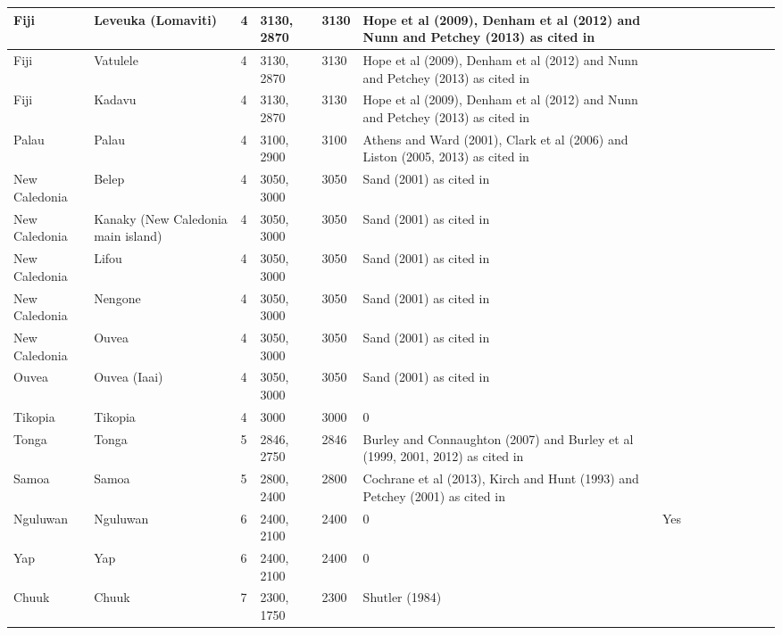 \documentclass[a4paper,10pt]{article} %
\begin{document}
\begin{landscape}
\begin{longtable}{| p{3cm}| p{4cm}| p{4cm}|p{2cm}|p{2cm}|p{2cm}|p{2cm}|p{2cm}|p{2cm}|p{2cm}|p{2cm}|p{2cm}|p{2cm}|p{2cm}}
 Fiji & Leveuka (Lomaviti) & 4 & 3130, 2870 & 3130 & Hope et al (2009), Denham et al (2012) and Nunn and Petchey (2013) as cited in \citet{rieth_cochrane_2018} &   \\ \hline
 Fiji & Vatulele & 4 & 3130, 2870 & 3130 & Hope et al (2009), Denham et al (2012) and Nunn and Petchey (2013) as cited in \citet{rieth_cochrane_2018} &   \\ \hline
 Fiji & Kadavu & 4 & 3130, 2870 & 3130 & Hope et al (2009), Denham et al (2012) and Nunn and Petchey (2013) as cited in \citet{rieth_cochrane_2018} &   \\ \hline
 Palau & Palau & 4 & 3100, 2900 & 3100 & Athens and Ward (2001), Clark et al (2006) and Liston (2005, 2013) as cited in \citet{rieth_cochrane_2018} &   \\ \hline
 New Caledonia & Belep & 4 & 3050, 3000 & 3050 & Sand (2001) as cited in \citet{rieth_cochrane_2018} &   \\ \hline
 New Caledonia & Kanaky (New Caledonia main island) & 4 & 3050, 3000 & 3050 & Sand (2001) as cited in \citet{rieth_cochrane_2018} &   \\ \hline
 New Caledonia & Lifou & 4 & 3050, 3000 & 3050 & Sand (2001) as cited in \citet{rieth_cochrane_2018} &   \\ \hline
 New Caledonia & Nengone & 4 & 3050, 3000 & 3050 & Sand (2001) as cited in \citet{rieth_cochrane_2018} &   \\ \hline
 New Caledonia & Ouvea & 4 & 3050, 3000 & 3050 & Sand (2001) as cited in \citet{rieth_cochrane_2018} &   \\ \hline
 Ouvea & Ouvea (Iaai) & 4 & 3050, 3000 & 3050 & Sand (2001) as cited in \citet{rieth_cochrane_2018} &   \\ \hline
 Tikopia & Tikopia & 4 & 3000 & 3000 & \citet{carson2012recent}  0 &   \\ \hline
 Tonga & Tonga & 5 & 2846, 2750 & 2846 & Burley and Connaughton (2007) and Burley et al (1999, 2001, 2012) as cited in \citet{rieth_cochrane_2018} &   \\ \hline
 Samoa & Samoa & 5 & 2800, 2400 & 2800 & Cochrane et al (2013), Kirch and Hunt (1993) and Petchey (2001) as cited in \citet{rieth_cochrane_2018} &   \\ \hline
 Nguluwan & Nguluwan & 6 & 2400, 2100 & 2400 & \citet{Napolitano_et_al_yap}  0 & Yes \\ \hline
 Yap & Yap & 6 & 2400, 2100 & 2400 & \citet{Napolitano_et_al_yap}  0 &   \\ \hline
 Chuuk & Chuuk & 7 & 2300, 1750 & 2300 & Shutler (1984)  \citet{rieth_cochrane_2018} &   \\ \hline

\end{longtable}
\end{landscape}
\end{document}
